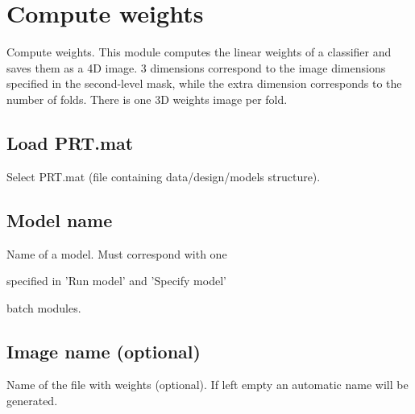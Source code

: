 
\chapter{Compute weights  \label{Chap:weights}}

\vskip 1.5cm

Compute weights. This module computes the linear weights of a classifier and saves them as a 4D image. 3 dimensions correspond to the image dimensions specified in the second-level mask, while the extra dimension corresponds to the number of folds. There is one 3D weights image per fold.


\section{Load PRT.mat}
Select PRT.mat (file containing data/design/models structure).


\section{Model name}
Name of a model. Must correspond with one 

specified in 'Run model' and 'Specify model'

batch modules.


\section{Image name (optional)}
Name of the file with weights (optional). If left empty  an automatic name will be generated.

